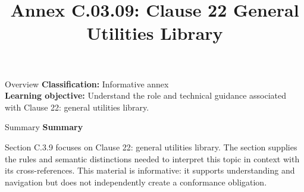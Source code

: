 \documentclass[10pt,letterpaper]{article}
\title{Annex C.03.09: Clause 22 General Utilities Library}
\author{}
\date{}
\begin{document}
\maketitle
\begin{CornellOverviewBox}{Overview}
\textbf{Classification:} Informative annex\\[2pt]
\textbf{Learning objective:} Understand the role and technical guidance associated with Clause 22: general utilities library.
\end{CornellOverviewBox}\begin{CornellSummaryBox}{Summary}
{\sffamily\bfseries\color{Accent} Summary}\par\vspace{3pt}Section C.3.9 focuses on Clause 22: general utilities library. The section supplies the rules and semantic distinctions needed to interpret this topic in context with its cross-references. This material is informative: it supports understanding and navigation but does not independently create a conformance obligation.
\end{CornellSummaryBox}
\end{document}
